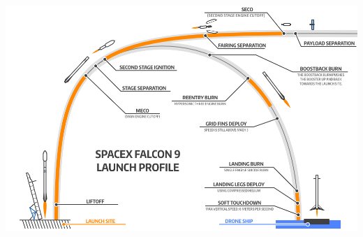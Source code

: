 \begin{frame}[t]{}
    \includegraphics[width=\textwidth]{images/suicideburn}
\end{frame}
{
%
\begin{frame}[t]{}
\end{frame}
}
